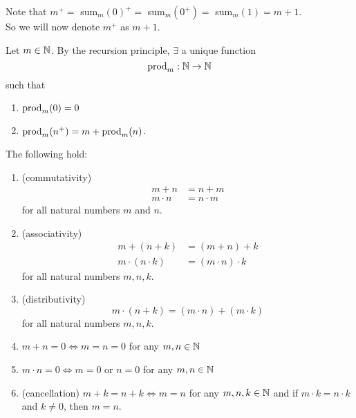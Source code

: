 \begin{rem}
    Note that $m^{+} =$ sum$_{m}(0)^{+} = $ sum$_{m}(0^{+}) = $ sum$_{m}(1) = m + 1$. \\
    So we will now denote $m^{+}$ as $m + 1$.
\end{rem}

\begin{defn} \label{defn:N:multiplication}
    Let $m \in \mathbb{N}$. By the recursion principle, $\exists$ a unique function \[
        \mathrm{prod}_{m} : \mathbb{N} \to \mathbb{N}
    \]
    such that
    \begin{enumerate}[label=(\alph*)]
        \item\label{defn:N:multiplication:zero} $\mathrm{prod}_{m}({0}) = 0$
        \item\label{defn:N:multiplication:recursion} $\mathrm{prod}_{m}({n^{+}}) = m + \mathrm{prod}_{m}({n})$.
    \end{enumerate}
\end{defn}

\begin{thm} \label{thm:N:properties}
    The following hold:
    \begin{enumerate}[label=(\alph*)]
        \item\label{thm:N:properties:commutativity} (commutativity)
        \begin{align*}
            m + n &= n + m \\
            m \cdot n &= n \cdot m
        \end{align*}
        for all natural numbers $m$ and $n$.

        \item\label{thm:N:properties:associativity} (associativity)
        \begin{align*}
            m + (n + k) &= (m + n) + k \\
            m \cdot (n \cdot k) &= (m \cdot n) \cdot k
        \end{align*}
        for all natural numbers $m, n, k$.

        \item\label{thm:N:distributivity} (distributivity) \[
            m \cdot (n + k) = (m \cdot n) + (m \cdot k)
        \] for all natural numbers $m, n, k$.
        \item\label{thm:N:m+n=0=>m=n=0} $m + n = 0 \iff m = n = 0$ for any $m, n \in \mathbb{N}$

        \item\label{thm:N:m.n=0=>m=0|n=0} $m \cdot n = 0 \iff m = 0$ or $n = 0$ for any $m, n \in \mathbb{N}$

        \item\label{thm:N:cancellation} (cancellation) $m + k = n + k \iff m = n$ for any $m, n, k \in \mathbb{N}$ and if $m \cdot k = n \cdot k$ and $k \neq 0$, then $m = n$.
    \end{enumerate}
\end{thm}

